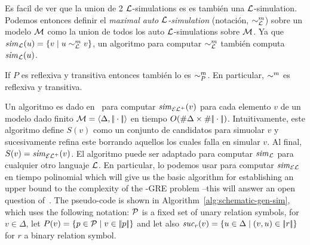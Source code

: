 \iffullversion
Es facil de ver que la union de 2 $\mathcal{L}$-simulations es
es tambi\'en una $\mathcal{L}$-simulation. Podemos entonces definir el \emph{maximal
auto $\mathcal{L}$-simulation} (notaci\'on, $\sim^m_{\mathcal{L}}$) sobre un modelo $\mathcal{M}$ como la union de todos los
auto $\mathcal{L}$-simulations sobre $\mathcal{M}$. Ya que
${\it sim}_{\mathcal{L}}(u) = \{v \mid u \sim^m_{\mathcal{L}} v\}$, un algoritmo
para computar $\sim^m_{\mathcal{L}}$ tambi\'en computa ${\it sim}_{\mathcal{L}}(u)$.
\else
\fi

\iffullversion
If $P$ es reflexiva y transitiva entonces tambi\'en lo es $\sim^m_P$. En
particular, $\sim^m$ es reflexiva y transitiva.
\else
\fi



Un algoritmo es dado en~\cite{HHK95} para computar ${\it sim}_{{\mathcal{EL}^+}}(v)$ para cada
elemento $v$ de un modelo dado finito
$\mathcal{M}=\langle \Delta,|\!|\cdot|\!| \rangle$
en tiempo $O(\# \Delta\times\# {|\!|\cdot|\!|})$.
Intuitivamente, este algoritmo
define $S(v)$ como un conjunto de candidatos para simuolar $v$ y
sucesivamente refina este borrando aquellos los cuales falla en simular $v$.
Al final, $S(v)={\it sim}_{\mathcal{EL}^+}(v)$. El algoritmo puede ser adaptado para
computar ${\it sim}_{\mathcal{L}}$ para cualquier otro languaje $\mathcal{L}$. En particular,
lo podemos usar para computar ${\it sim}_\mathcal{EL}$ en tiempo polinomial which will
give us the basic algorithm for establishing an upper bound to the
complexity of the \EL-GRE problem --this will answer an open
question of~\cite{areces08}. The pseudo-code is shown in
Algorithm~\ref{alg:schematic-gen-sim}, which uses the following
notation: $\mathcal{P}$ is a fixed set of unary relation symbols,  for $v\in
\Delta$, let $P(v)=\{p\in\mathcal{P}\mid v\in|\!|p|\!|\}$ and let also
${\it suc}_{r}(v)=\{u\in\Delta\mid(v,u)\in|\!|r|\!|\}$ for $r$ a binary
relation symbol.